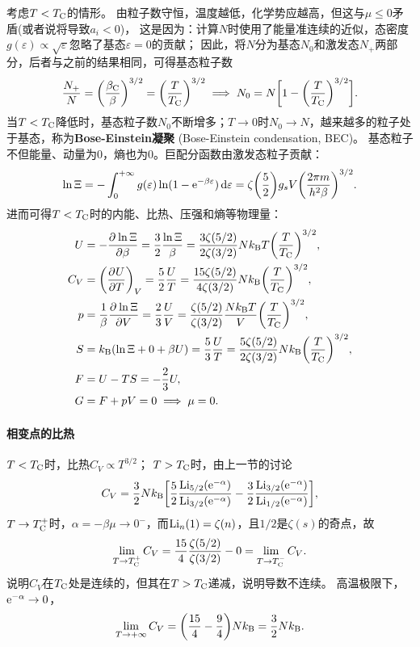 考虑$T<T_\crt$的情形。
由粒子数守恒，温度越低，化学势应越高，但这与$\mu\leq 0$矛盾(或者说将导致$a_i<0$)，
这是因为：计算$N$时使用了能量准连续的近似，态密度$g(\varepsilon)\propto\sqrt\varepsilon$忽略了基态$\varepsilon=0$的贡献；
因此，将$N$分为基态$N_0$和激发态$N_+$两部分，后者与之前的结果相同，可得基态粒子数
\begin{equation}
	\frac{N_+}N=\biggkh{\frac{\beta_\crt}\beta}^{3/2}=\biggkh{\frac T{T_\crt}}^{3/2}
	\implies
	N_0=N\biggfkh{1-\biggkh{\frac{T}{T_\crt}}^{3/2}}.
\end{equation}
当$T<T_\crt$降低时，基态粒子数$N_0$不断增多；$T\to 0$时$N_0\to N$，越来越多的粒子处于基态，称为\textbf{Bose-Einstein凝聚} (Bose-Einstein condensation, BEC)。
基态粒子不但能量、动量为0，熵也为0。巨配分函数由激发态粒子贡献：
\begin{equation}
	\ln\Xi=-\int\zti g(\varepsilon)\ln(1-\e{-\beta\varepsilon})\d\varepsilon=\zeta\biggkh{\frac52}g_sV\biggkh{\frac{2\pi m}{h^2\beta}}^{3/2}.
\end{equation}
进而可得$T<T_\crt$时的内能、比热、压强和熵等物理量：
\begin{subequations}
	\begin{align}
		U&=-\pv{\ln\Xi}\beta=\frac32\frac{\ln\Xi}\beta=\frac{3\zeta(5/2)}{2\zeta(3/2)}N\kB T\biggkh{\frac T{T_\crt}}^{3/2},\\
		C_V&=\pu[V]UT=\frac52\frac UT=\frac{15\zeta(5/2)}{4\zeta(3/2)}N\kB\biggkh{\frac T{T_\crt}}^{3/2},\\
		p&=\frac1\beta\pv{\ln\Xi}V=\frac23\frac UV=\frac{\zeta(5/2)}{\zeta(3/2)}\frac{N\kB T}V\biggkh{\frac T{T_\crt}}^{3/2},\\
		S&=\kB(\ln\Xi+0+\beta U)=\frac53\frac UT=\frac{5\zeta(5/2)}{2\zeta(3/2)}N\kB\biggkh{\frac T{T_\crt}}^{3/2},\\
		F&=U-TS=-\frac23U,\\
		G&=F+pV=0\implies\mu=0.
	\end{align}
\end{subequations}

\paragraph{相变点的比热}
$T<T_\crt$时，比热$C_V\propto T^{3/2}$；
$T>T_\crt$时，由上一节的讨论
\[
	C_V=\frac32N\kB\biggfkh{\frac52\frac{\Li_{5/2}(\e{-\alpha})}{\Li_{3/2}(\e{-\alpha})}-\frac32\frac{\Li_{3/2}(\e{-\alpha})}{\Li_{1/2}(\e{-\alpha})}},
\]
$T\to T_\crt^+$时，$\alpha=-\beta\mu\to 0^-$，而$\Li_n(1)=\zeta(n)$，且$1/2$是$\zeta(s)$的奇点，故 
\[
	\lim_{T\to T_\crt^+}C_V=\frac{15}4\frac{\zeta(5/2)}{\zeta(3/2)}-0=\lim_{T\to T_\crt^-}C_V.
\]
说明$C_V$在$T_\crt$处是连续的，但其在$T>T_\crt$递减，说明导数不连续。
高温极限下，$\e{-\alpha}\to0$，
\[
	\lim_{T\to+\infty}C_V=\biggkh{\frac{15}4-\frac94}N\kB=\frac32N\kB.
\]


